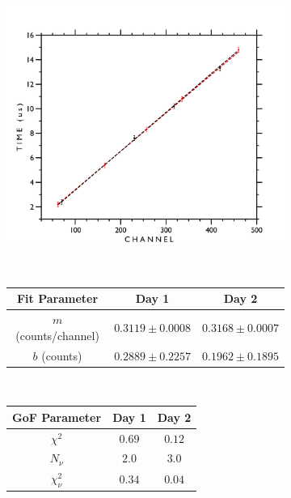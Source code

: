 \documentclass[
    aps, 
    twocolumn, 
    secnumarabic, 
    balancelastpage, 
    amsmath, 
    amssymb, 
    nofootinbib, 
    floatfix
]{revtex4-2}
\begin{document}
\begin{figure}[t]
	\centering
     	\begin{subfigure}[t]{12cm}
         	\centering
		\includegraphics[width=12cm]{figures/time_calibration.png}
	\end{subfigure}
	\\
	\bigskip
	\begin{subfigure}[t]{12cm}
         	\centering
		\begin{tabular}{c|cc}
              		\textbf{Fit Parameter} & \textbf{Day 1} & \textbf{Day 2} \\
            		\hline
	    		$m$ (counts/channel) & $ 0.3119 \pm 0.0008 $ & $0.3168 \pm 0.0007$ \\
	    		$b$ (counts) &  $0.2889 \pm 0.2257$ & $0.1962 \pm 0.1895$ \\
		\end{tabular}
     	\end{subfigure}
     	\\
     	\bigskip
     	\begin{subfigure}[t]{12cm}
         	\centering
		\begin{tabular}{c|cc}
	    		\textbf{GoF Parameter} & \textbf{Day 1} & \textbf{Day 2} \\
            		\hline
	    		$\chi^2$ & $0.69$ & $0.12$ \\ 
	    		$N_\nu$ & $2.0$ & $3.0$ \\
	    		$\chi^2_\nu$ & $0.34$ & $0.04$ \\

\end{tabular}
\end{subfigure}
\end{figure}
\end{document}
